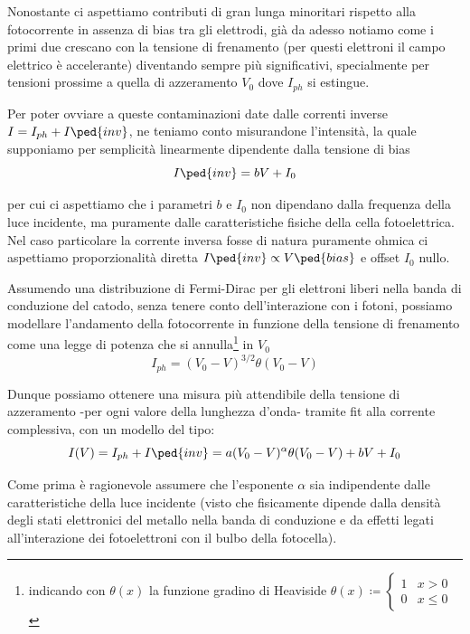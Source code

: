 \documentclass[10pt, a4paper, italian]{article}
\begin{document}
Nonostante ci aspettiamo contributi di gran lunga minoritari rispetto alla
fotocorrente in assenza di bias tra gli elettrodi, già da adesso notiamo come
i primi due crescano con la tensione di frenamento (per questi elettroni il
campo elettrico è accelerante) diventando sempre più significativi,
specialmente per tensioni prossime a quella di azzeramento $V_0$ dove
$I_{ph}$ si estingue.

Per poter ovviare a queste contaminazioni date dalle correnti inverse
$I = I_{ph} + I\ped{inv}$, ne teniamo conto misurandone l'intensità, la quale
supponiamo per semplicità linearmente dipendente dalla tensione di bias
\begin{equation}\label{eq: I0fit}
I\ped{inv} = bV + I_0
\end{equation}

per cui ci aspettiamo che i parametri $b$ e $I_0$ non dipendano dalla
frequenza della luce incidente, ma puramente dalle caratteristiche fisiche
della cella fotoelettrica. Nel caso particolare la corrente inversa fosse di
natura puramente ohmica ci aspettiamo proporzionalità diretta
$I\ped{inv} \propto V\ped{bias}$ e offset $I_0$ nullo.

Assumendo una distribuzione di Fermi-Dirac per gli elettroni liberi nella
banda di conduzione del catodo, senza tenere conto dell'interazione con i
fotoni, possiamo modellare l'andamento della fotocorrente in funzione della
tensione di frenamento come una legge di potenza che si annulla\footnote{
indicando con $\theta(x)$ la funzione gradino di Heaviside $\theta(x) \coloneqq
\begin{cases} 1 & x > 0 \\ 0 & x \leq 0 \end{cases}$} in $V_0$
\[
I_{ph} = (V_0 - V)^{3/2} \theta(V_0 - V)
\]

Dunque possiamo ottenere una misura più attendibile della tensione di
azzeramento -per ogni valore della lunghezza d'onda- tramite fit alla corrente
complessiva, con un modello del tipo:
\begin{equation}\label{eq: Ifit}
I(V) = I_{ph} + I\ped{inv} = a(V_0 - V)^\alpha \theta(V_0 - V) + bV + I_0
\end{equation}

Come prima è ragionevole assumere che l'esponente $\alpha$ sia indipendente
dalle caratteristiche della luce incidente (visto che fisicamente dipende
dalla densità degli stati elettronici del metallo nella banda di conduzione e
da effetti legati all'interazione dei fotoelettroni con il bulbo della
fotocella).
\end{document}
